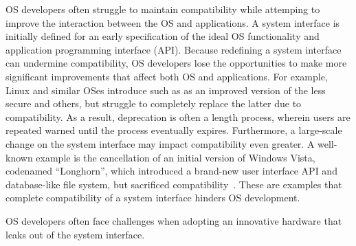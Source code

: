 OS developers often struggle to maintain compatibility while attemping to improve
the interaction between the OS and applications.
A system interface is initially defined for an early specification of the ideal OS functionality
and application programming interface (API).
Because redefining a system interface can undermine compatibility, OS developers lose the opportunities to make more significant improvements that affect both OS and applications.
For example, Linux and similar OSes
introduce \linuxapis{} such as  as an improved version
of the less secure  and others, but struggle to completely replace the latter due to compatibility.
As a result, deprecation is often a length process, wherein users are repeated warned
until the process eventually expires.
Furthermore, a large-scale change on the system interface
may impact compatibility even greater.
A well-known example is the cancellation of an initial version of Windows Vista, 
codenamed ``Longhorn'',
which introduced a brand-new user interface API
and database-like file system, but sacrificed compatibility~\cite{spolsky04microsoft-api-war}.
These are examples that complete compatibility of a system interface
hinders OS development.





OS developers often face challenges when adopting an innovative hardware
that leaks out of the system interface.



